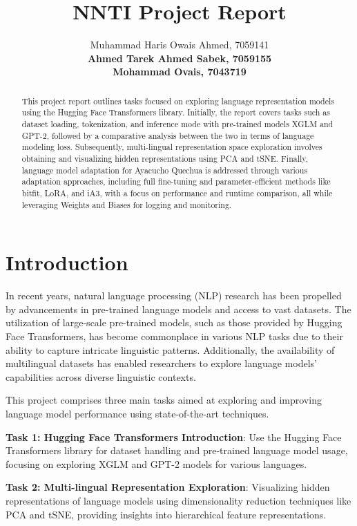 \documentclass[11pt]{article}
\title{NNTI Project Report}
\author{
  Muhammad Haris Owais Ahmed, 7059141 \\
  {\bf Ahmed Tarek Ahmed Sabek, 7059155} \\
  {\bf Mohammad Ovais, 7043719} \\
}
\begin{document}
{\makeatletter\acl@finalcopytrue
  \maketitle
}
\begin{abstract}
This project report outlines tasks focused on exploring language representation models using the Hugging Face Transformers library. Initially, the report covers tasks such as dataset loading, tokenization, and inference mode with pre-trained models XGLM and GPT-2, followed by a comparative analysis between the two in terms of language modeling loss. Subsequently, multi-lingual representation space exploration involves obtaining and visualizing hidden representations using PCA and tSNE. Finally, language model adaptation for Ayacucho Quechua is addressed through various adaptation approaches, including full fine-tuning and parameter-efficient methods like bitfit, LoRA, and iA3, with a focus on performance and runtime comparison, all while leveraging Weights and Biases for logging and monitoring.
\end{abstract}

\section{Introduction}

In recent years, natural language processing (NLP) research has been propelled by advancements in pre-trained language models and access to vast datasets. The utilization of large-scale pre-trained models, such as those provided by Hugging Face Transformers, has become commonplace in various NLP tasks due to their ability to capture intricate linguistic patterns. Additionally, the availability of multilingual datasets has enabled researchers to explore language models' capabilities across diverse linguistic contexts.

This project comprises three main tasks aimed at exploring and improving language model performance using state-of-the-art techniques. 

\textbf{Task 1: Hugging Face Transformers Introduction}: Use the Hugging Face Transformers library for dataset handling and pre-trained language model usage, focusing on exploring XGLM and GPT-2 models for various languages.

\textbf{Task 2: Multi-lingual Representation Exploration}: Visualizing hidden representations of language models using dimensionality reduction techniques like PCA and tSNE, providing insights into hierarchical feature representations.
\end{document}
